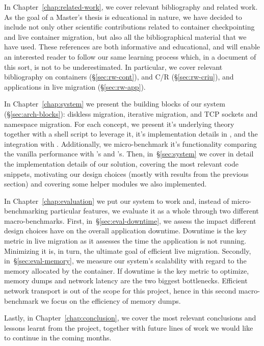 In Chapter~\ref{chap:related-work}, we cover relevant bibliography and related work.
As the goal of a Master's thesis is educational in nature, we have decided to include not only other scientific contributions related to container checkpointing and live container migration, but also all the bibliographical material that we have used.
These references are both informative and educational, and will enable an interested reader to follow our same learning process which, in a document of this sort, is not to be underestimated.
In particular, we cover relevant bibliography on containers (\S\ref{sec:rw-cont}), \criu and C/R (\S\ref{sec:rw-criu}), and applications in live migration (\S\ref{sec:rw-app}).

In Chapter~\ref{chap:system} we present the building blocks of our system (\S\ref{sec:arch-blocks}): diskless migration, iterative migration, and TCP sockets and namespace migration.
For each concept, we present it's underlying theory together with a shell script to leverage it, it's implementation details in \criu, and the integration with \runc.
Additionally, we micro-benchmark it's functionality comparing the vanilla performance with \criu's and \runc's.
Then, in~\S\ref{sec:system} we cover in detail the implementation details of our solution, covering the most relevant code snippets, motivating our design choices (mostly with results from the previous section) and covering some helper modules we also implemented.

In Chapter~\ref{chap:evaluation} we put our system to work and, instead of micro-benchmarking particular features, we evaluate it as a whole through two different macro-benchmarks.
First, in~\S\ref{sec:eval-downtime}, we assess the impact different design choices have on the overall application downtime.
Downtime is the key metric in live migration as it assesses the time the application is not running.
Minimizing it is, in turn, the ultimate goal of efficient live migration.
Secondly, in~\S\ref{sec:eval-memory}, we measure our system's scalability with regard to the memory allocated by the container.
If downtime is the key metric to optimize, memory dumps and network latency are the two biggest bottlenecks.
Efficient network transport is out of the scope for this project, hence in this second macro-benchmark we focus on the efficiency of memory dumps.

Lastly, in Chapter~\ref{chap:conclusion}, we cover the most relevant conclusions and lessons learnt from the project, together with future lines of work we would like to continue in the coming months.
